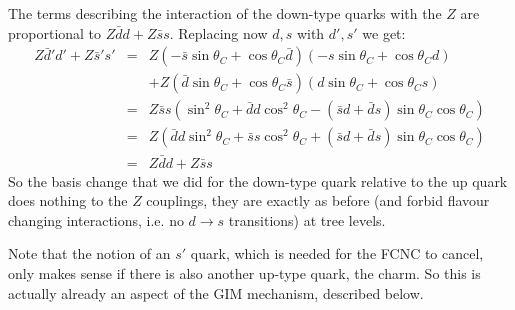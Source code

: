  The terms describing the interaction of the down-type quarks with the $Z$ are proportional to $Z\bar{d}d + Z\bar{s}s$. Replacing now $d, s$ with $d', s'$ we get:
\begin{eqnarray}
 Z\bar{d}'d' + Z\bar{s}'s'
&=&
 Z\left(-\bar{s}\sin\theta_C + \cos\theta_C \bar{d}\right)
 \left(-s\sin\theta_C + \cos\theta_C d\right)
\nonumber\\
&&+
 Z\left( \bar{d}\sin\theta_C + \cos\theta_C \bar{s}\right)
 \left( d\sin\theta_C + \cos\theta_C s\right)
\nonumber\\
&=&
  Z\bar{s}s \left(\sin^2\theta_C + \bar{d}d \cos^2\theta_C
- (\bar{s}d + \bar{d}s) \sin\theta_C\cos\theta_C\right)
\nonumber\\
&=&
  Z\left(\bar{d}d \sin^2\theta_C + \bar{s}s \cos^2\theta_C
+ (\bar{s}d + \bar{d}s) \sin\theta_C\cos\theta_C\right)
\nonumber\\
&=& Z\bar{d}d + Z\bar{s}s 
\end{eqnarray}
So the basis change that we did for the down-type quark relative to the up quark does nothing to the $Z$ couplings, they are exactly as before (and forbid flavour changing interactions, i.e. no $d \to s$ transitions) at tree levels.

Note that the notion of an $s'$ quark, which is needed for the FCNC to cancel, only makes sense if there is also another up-type quark, the charm. So this is actually already an aspect of the GIM mechanism, described below.
